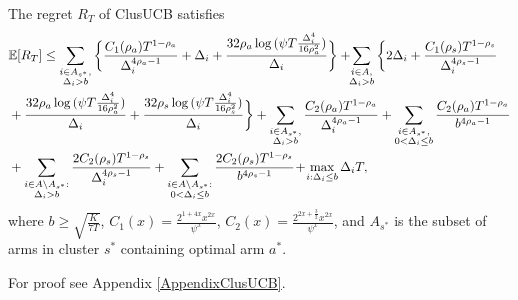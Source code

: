 \begin{theorem}
\label{Result:Theorem:1}
The regret $R_T$ of ClusUCB satisfies
\begin{align*}
&\mathbb{E} [R_{T}]\leq 
\sum\limits_{\substack{i\in A_{s^{*}},\\\Delta_{i} > b}}\bigg\lbrace \frac{C_1(\rho_{a})T^{1-\rho_{a}}}{\Delta_{i}^{4\rho_{a}-1}} + \Delta_{i}
 + \frac{32\rho_{a}\log{(\psi T\frac{\Delta_{i}^{4}}{16\rho_{a}^{2}})}}{\Delta_{i}} \bigg\rbrace
 + \! \! \sum\limits_{\substack{i\in A,\\\Delta_{i} > b}} \bigg\lbrace 2\Delta_{i}+
\frac{C_1(\rho_{s})T^{1-\rho_{s}}}{\Delta_{i}^{4\rho_{s}-1}} \\
&+ \frac{32\rho_{a}\log{(\psi T\frac{\Delta_{i}^{4}}{16\rho_{a}^{2}})}}{\Delta_{i}} 
+ \frac{32\rho_{s}\log{(\psi T\frac{\Delta_{i}^{4}}{16\rho_{s}^{2}})}}{\Delta_{i}}\bigg\rbrace 
+ \sum\limits_{\substack{i\in A_{s^{*}},\\ \Delta_{i} > b}} 
\frac{C_2(\rho_{a})T^{1-\rho_{a}}}{\Delta_{i}^{4\rho_{a}-1}}
+\sum\limits_{\substack{i\in A_{s^{*}},\\0 < \Delta_{i}\leq b}}\frac{C_2(\rho_a)T^{1-\rho_{a}}}{b^{4\rho_{a} -1}}\\ 
&+ \sum_{\substack{i\in A\setminus A_{s^*}:\\\Delta_{i}> b}}\frac{2C_{2}(\rho_{s})T^{1-\rho_{s}}}{\Delta_{i}^{4\rho_{s}-1}} +\sum_{\substack{i\in A \setminus A_{s^*}:\\ 0 < \Delta_{i} \leq b}}\frac{2C_{2}(\rho_{s})T^{1-\rho_{s}}}{b^{4\rho_{s}-1}}
 \!+\! \max\limits_{i:\Delta_{i}\leq b}\Delta_{i}T, 
\end{align*}
where $b\geq \sqrt{\frac{K}{7 T}}$, $C_1(x) = \frac{2^{1+4x}x^{2x}}{\psi^{x}}$, $C_2(x) = \frac{2^{2x+\frac{3}{2}}x^{2x}}{\psi^{x}}$, and $A_{s^{*}}$ is the subset of arms in cluster $s^{*}$ containing optimal arm $a^{*}$.
\end{theorem}
 For proof see Appendix \ref{AppendixClusUCB}.

